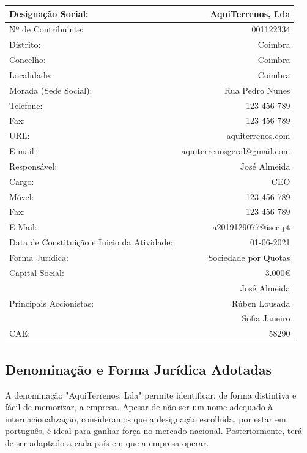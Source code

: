 \documentclass[11pt]{article}
\begin{document}
	\begin{center}
		\begin{tabular}{ | l | r | }
			\hline
			Designação Social: & AquiTerrenos, Lda \\
			\hline
			Nº de Contribuinte: & 001122334 \\
			\hline 
			Distrito: & Coimbra \\
			\hline   
			Concelho: & Coimbra \\
			\hline   
			Localidade: & Coimbra \\
			\hline   
			Morada (Sede Social): & Rua Pedro Nunes \\
			\hline   
			Telefone: & 123 456 789 \\
			\hline 
			Fax: & 123 456 789 \\
			\hline 
			URL: & aquiterrenos.com \\
			\hline
			E-mail: & aquiterrenosgeral@gmail.com \\
			\hline 
			Responsável: & José Almeida \\
			\hline 
			Cargo: & CEO \\ 
			\hline
			Móvel: & 123 456 789 \\
			\hline 
			Fax: & 123 456 789 \\
			\hline 
			E-Mail: & a2019129077@isec.pt \\
			\hline 
			Data de Constituição e Inicio da Atividade: & 01-06-2021 \\
			\hline 
			Forma Jurídica: & Sociedade por Quotas \\
			\hline 
			Capital Social: & 3.000€ \\
			\hline
			\multirow{3}{*}{Principais Accionistas:} & José Almeida \\
			& Rúben Lousada  \\
			& Sofia Janeiro  \\
			\hline 
			CAE: & 58290 \\
			\hline 
		\end{tabular}
	\end{center}

	\large
	\subsection{Denominação e Forma Jurídica Adotadas}
	
	\normalsize
	
	A denominação "AquiTerrenos, Lda" permite identificar, de forma distintiva e fácil de memorizar, a empresa. Apesar de não ser um nome adequado à internacionalização, consideramos que a designação escolhida, por estar em português, é ideal para ganhar força no mercado nacional. Posteriormente, terá de ser adaptado a cada país em que a empresa operar.
	
\end{document}
